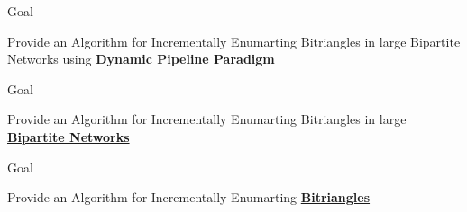 \begin{frame}[fragile]{Goal}
  \begin{center}
    Provide an Algorithm for Incrementally Enumarting Bitriangles in large Bipartite Networks using \textbf{Dynamic Pipeline Paradigm}
  \end{center}    
\end{frame}

\begin{frame}[fragile]{Goal}
  \begin{center}
    {\color{light}Provide an Algorithm for Incrementally Enumarting Bitriangles in large} \underline{{\color{red}\textbf{Bipartite Networks}}} {}
  \end{center}    
  \begin{figure}
    \centering
  \end{figure}
\end{frame}

\begin{frame}[fragile]{Goal}
  \begin{center}
    {\color{light}Provide an Algorithm for Incrementally Enumarting} \underline{{\color{red}\textbf{Bitriangles}}} {}
  \end{center}    
  \begin{figure}
    \centering
  \end{figure}
\end{frame}

